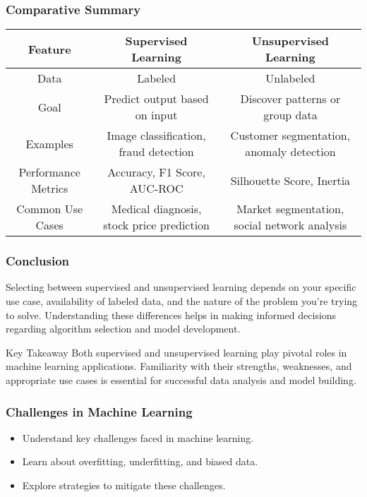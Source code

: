 \documentclass[aspectratio=169]{beamer}
\begin{document}
\begin{frame}[fragile]
    \frametitle{Comparative Summary}
    \begin{table}[htbp]
        \centering
        \begin{tabular}{|c|c|c|}
            \hline
            \textbf{Feature} & \textbf{Supervised Learning} & \textbf{Unsupervised Learning} \\
            \hline
            Data & Labeled & Unlabeled \\
            \hline
            Goal & Predict output based on input & Discover patterns or group data \\
            \hline
            Examples & Image classification, fraud detection & Customer segmentation, anomaly detection \\
            \hline
            Performance Metrics & Accuracy, F1 Score, AUC-ROC & Silhouette Score, Inertia \\
            \hline
            Common Use Cases & Medical diagnosis, stock price prediction & Market segmentation, social network analysis \\
            \hline
        \end{tabular}
    \end{table}
\end{frame}

\begin{frame}[fragile]
    \frametitle{Conclusion}
    Selecting between supervised and unsupervised learning depends on your specific use case, availability of labeled data, and the nature of the problem you're trying to solve. Understanding these differences helps in making informed decisions regarding algorithm selection and model development.

    \begin{block}{Key Takeaway}
        Both supervised and unsupervised learning play pivotal roles in machine learning applications. Familiarity with their strengths, weaknesses, and appropriate use cases is essential for successful data analysis and model building.
    \end{block}
\end{frame}

\begin{frame}
    \frametitle{Challenges in Machine Learning}
    \begin{itemize}
        \item Understand key challenges faced in machine learning.
        \item Learn about overfitting, underfitting, and biased data.
        \item Explore strategies to mitigate these challenges.
    \end{itemize}
\end{frame}
\end{document}
